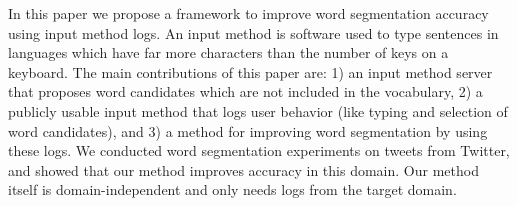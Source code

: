 In this paper we propose a framework to improve word segmentation accuracy using input method logs.  An input method is software used to type sentences in languages which have far more characters than the number of keys on a keyboard.  The main contributions of this paper are: 1) an input method server that proposes word candidates which are not included in the vocabulary, 2) a publicly usable input method that logs user behavior (like typing and selection of word candidates), and 3) a method for improving word segmentation by using these logs.  We conducted word segmentation experiments on tweets from Twitter, and showed that our method improves accuracy in this domain.  Our method itself is domain-independent and only needs logs from the target domain.
